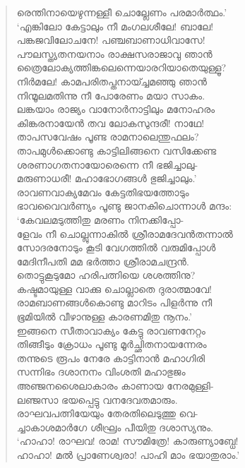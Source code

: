 \begin{verse}
രെന്തിനായെഴുന്നള്ളീ ചൊല്ലേണം പരമാര്‍ത്ഥം.’\\
‘എങ്കിലോ കേട്ടാലും നീ മംഗലശീലേ! ബാലേ!\\
പങ്കജവിലോചനേ! പഞ്ചബാണാധിവാസേ!\\
പൗലസ്ത്യതനയനാം രാക്ഷസരാജാവു ഞാന്‍\\
ത്രൈലോക്യത്തിങ്കലെന്നെയാരറിയാതെയുള്ളൂ?\\
നിര്‍മലേ! കാമപരിതപ്തനായ്ച്ചമഞ്ഞു ഞാന്‍\\
നിന്മൂലമതിന്നു നീ പോരേണം മയാ സാകം.\\
ലങ്കയാം രാജ്യം വാനോര്‍നാട്ടിലും മനോഹരം\\
കിങ്കരനായേന്‍ തവ ലോകസുന്ദരീ! നാഥേ!\\
താപസവേഷം പൂണ്ട രാമനാലെന്തുഫലം?\\
താപമുള്‍ക്കൊണ്ടു കാട്ടിലിങ്ങനെ വസിക്കേണ്ട\\
ശരണാഗതനായോരെന്നെ നീ ഭജിച്ചാലു-\\
മരുണാധരീ! മഹാഭോഗങ്ങള്‍ ഭുജിച്ചാലും.’\\
രാവണവാക്യമേവം കേട്ടതിഭയത്തോടും\\
ഭാവവൈവര്‍ണ്യം പൂണ്ടു ജാനകിചൊന്നാള്‍ മന്ദം:\\
‘കേവലമടുത്തിതു മരണം നിനക്കിപ്പോ-\\
ളേവം നീ ചൊല്ലുന്നാകില്‍ ശ്രീരാമദേവന്‍തന്നാല്‍\\
സോദരനോടും കൂടി വേഗത്തില്‍ വരുമിപ്പോള്‍\\
മേദിനീപതി മമ ഭര്‍ത്താ ശ്രീരാമചന്ദ്രന്‍.\\
തൊട്ടുകൂടുമോ ഹരിപത്നിയെ ശശത്തിനു?\\
കഷ്ടമായുള്ള വാക്കു ചൊല്ലാതെ ദുരാത്മാവേ!\\
രാമബാണങ്ങള്‍കൊണ്ടു മാറിടം പിളര്‍ന്നു നീ\\
ഭൂമിയില്‍ വീഴാനുള്ള കാരണമിതു നൂനം.’\\
ഇങ്ങനെ സീതാവാക്യം കേട്ടു രാവണനേറ്റം\\
തിങ്ങീടും ക്രോധം പൂണ്ടു മൂര്‍ച്ഛിതനായന്നേരം\\
തന്നുടെ രൂപം നേരേ കാട്ടിനാന്‍ മഹാഗിരി\\
സന്നിഭം ദശാനനം വിംശതി മഹാഭുജം\\
അഞ്ജനശൈലാകാരം കാണായ നേരമുള്ളി-\\
ലഞ്ജസാ ഭയപ്പെട്ടു വനദേവതമാരും.\\
രാഘവപത്നിയേയും തേരതിലെടുത്തു വെ-\\
ച്ചാകാശമാര്‍ഗേ ശീഘ്രം പീയിതു ദശാസ്യനും.\\
‘ഹാഹാ! രാഘവ! രാമ! സൗമിത്രേ! കാരുണ്യാബ്ധേ!\\
ഹാഹാ! മല്‍ പ്രാണേശ്വരാ! പാഹി മാം ഭയാതുരാം.’\\

\end{verse}
